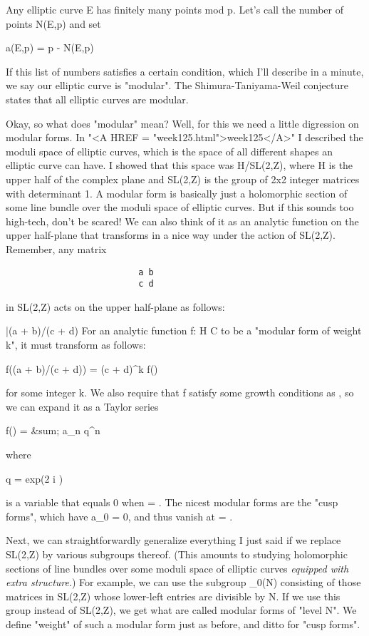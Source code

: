 Any elliptic curve E has finitely many points mod p.  Let's call the 
number of points N(E,p) and set

a(E,p) = p - N(E,p)

If this list of numbers satisfies a certain condition, which I'll
describe in a minute, we say our elliptic curve is "modular".  The
Shimura-Taniyama-Weil conjecture states that all elliptic curves
are modular.

Okay, so what does "modular" mean?  Well, for this we need a
little digression on modular forms.  In "<A HREF =
"week125.html">week125</A>" I described the moduli space of
elliptic curves, which is the space of all different shapes an
elliptic curve can have.  I showed that this space was H/SL(2,Z),
where H is the upper half of the complex plane and SL(2,Z) is the
group of 2x2 integer matrices with determinant 1.  A modular form is
basically just a holomorphic section of some line bundle over the
moduli space of elliptic curves.  But if this sounds too high-tech,
don't be scared!  We can also think of it as an analytic function on
the upper half-plane that transforms in a nice way under the action of
SL(2,Z).  Remember, any matrix

\begin{verbatim}
                          a b
                          c d

\end{verbatim}
    
in SL(2,Z) acts on the upper half-plane as follows:

                \tau  |\to  (a \tau  + b)/(c \tau  + d)
For an analytic function f: H \to  C to be a "modular form of
weight k", it must transform as follows:

f((a \tau  + b)/(c \tau  + d)) = (c \tau  + d)^{k} f(\tau )

for some integer k.   We also require that f satisfy some growth 
conditions as \tau  \to  \infty , so we can expand it as a Taylor series

f(\tau ) = &sum; a_{n} q^{n}

where 

q = exp(2 \pi  i \tau )

is a variable that equals 0 when \tau  = \infty .  The nicest modular
forms are the "cusp forms", which have a_{0} = 0,
and thus vanish at \tau  = \infty .

Next, we can straightforwardly generalize everything I just said if we
replace SL(2,Z) by various subgroups thereof.  (This amounts to
studying holomorphic sections of line bundles over some moduli space
of elliptic curves \emph{equipped with extra structure}.)  For
example, we can use the subgroup \Gamma _{0}(N) consisting of those
matrices in SL(2,Z) whose lower-left entries are divisible by N.  If
we use this group instead of SL(2,Z), we get what are called modular
forms of "level N".  We define "weight" of such a
modular form just as before, and ditto for "cusp forms".

